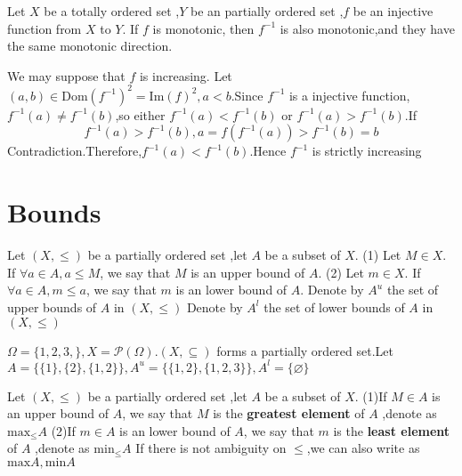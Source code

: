 \documentclass{book}
\begin{document}
\begin{propositionenv}
    Let $X$ be a totally ordered set ,$Y$ be an partially ordered set ,$f$ be an injective function from $X$ to $Y$. If $f$ is monotonic, then $f^{-1}$ is also monotonic,and they have the same monotonic direction.
\end{propositionenv}
\begin{proofenv}
    We may suppose that $f$ is increasing.
    Let $(a,b)\in \mathrm{Dom}(f^{-1})^2=\mathrm{Im}(f)^2,a<b$.Since $f^{-1}$ is a injective function,$f^{-1}(a)\not =f^{-1}(b)$,so either $f^{-1}(a)<f^{-1}(b)$ or $f^{-1}(a)>f^{-1}(b)$.If $$f^{-1}(a)>f^{-1}(b),a=f(f^{-1}(a))>f^{-1}(b)=b$$Contradiction.Therefore,$f^{-1}(a)<f^{-1}(b)$.Hence $f^{-1}$ is strictly increasing
\end{proofenv}
\section{Bounds}
\begin{definitionenv}
    Let $(X,\le)$ be a partially ordered set ,let $A$ be a subset of $X$.
    \newline
    (1) Let $M\in X$. If $\forall a \in A ,a\le M$, we say that $M$ is an upper bound of $A$. 
    \newline
    (2) Let $m\in X$. If $\forall a \in A ,m\le a$, we say that $m$ is an lower bound of $A$. 
    \newline
    Denote by $A^u$ the set of upper bounds of $A$ in $(X,\le)$
    \newline
     Denote by $A^l$ the set of lower bounds of $A$ in $(X,\le)$

\end{definitionenv}
\begin{exampleenv}
    $\Omega=\{1,2,3,\},X=\mathcal{P} (\Omega).(X,\subseteq)$ forms a partially ordered set.Let $A=\{\{1\},\{2\},\{1,2\}\},A^u=\{\{1,2\},\{1,2,3\}\},A^l=\{\varnothing\}$
\end{exampleenv}
\begin{definitionenv}
    Let $(X,\le)$ be a partially ordered set ,let $A$ be a subset of $X$.
    \newline
    (1)If $M \in A$ is an upper bound of $A$, we say that $M$ is the \textbf{greatest element} of $A$ ,denote as $\mathrm{max}_\le A$
    \newline
    (2)If $m \in A$ is an lower bound of $A$, we say that $m$ is the \textbf{least element} of $A$ ,denote as $\mathrm{min}_\le A$
    \newline
    If there is not ambiguity on $\le$,we can also write as $\mathrm{max}A,\mathrm{min}A$
\end{definitionenv}
\end{document}
